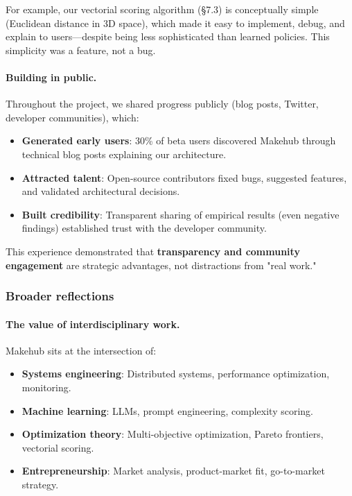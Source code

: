 \documentclass[english]{article}
\begin{document}
For example, our vectorial scoring algorithm (§7.3) is conceptually simple (Euclidean distance in 3D space), which made it easy to implement, debug, and explain to users—despite being less sophisticated than learned policies. This simplicity was a feature, not a bug.

\paragraph{Building in public.}

Throughout the project, we shared progress publicly (blog posts, Twitter, developer communities), which:
\begin{itemize}
    \item \textbf{Generated early users}: 30\% of beta users discovered Makehub through technical blog posts explaining our architecture.
    \item \textbf{Attracted talent}: Open-source contributors fixed bugs, suggested features, and validated architectural decisions.
    \item \textbf{Built credibility}: Transparent sharing of empirical results (even negative findings) established trust with the developer community.
\end{itemize}

This experience demonstrated that \textbf{transparency and community engagement} are strategic advantages, not distractions from "real work."

\subsubsection{Broader reflections}

\paragraph{The value of interdisciplinary work.}

Makehub sits at the intersection of:
\begin{itemize}
    \item \textbf{Systems engineering}: Distributed systems, performance optimization, monitoring.
    \item \textbf{Machine learning}: LLMs, prompt engineering, complexity scoring.
    \item \textbf{Optimization theory}: Multi-objective optimization, Pareto frontiers, vectorial scoring.
    \item \textbf{Entrepreneurship}: Market analysis, product-market fit, go-to-market strategy.
\end{itemize}
\end{document}
